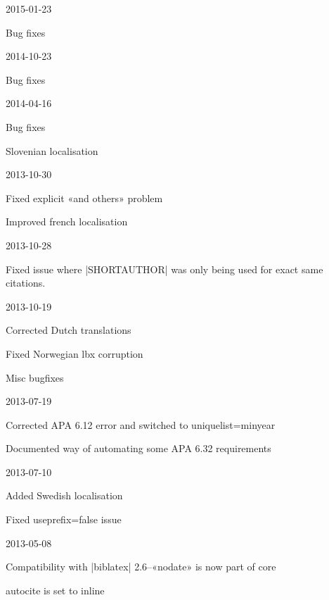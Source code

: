\documentclass{ltxdockit}
\begin{document}
\begin{changelog}

\begin{release}{6.7}{2015-01-23}
\item Bug fixes
\end{release}

\begin{release}{6.6}{2014-10-23}
\item Bug fixes
\end{release}

\begin{release}{6.5}{2014-04-16}
\item Bug fixes
\item Slovenian localisation
\end{release}

\begin{release}{6.4}{2013-10-30}
\item Fixed explicit «and others» problem
\item Improved french localisation
\end{release}

\begin{release}{6.3}{2013-10-28}
\item Fixed issue where |SHORTAUTHOR| was only being used for exact same citations.
\end{release}

\begin{release}{6.2}{2013-10-19}
\item Corrected Dutch translations
\item Fixed Norwegian lbx corruption
\item Misc bugfixes
\end{release}

\begin{release}{6.1}{2013-07-19}
\item Corrected APA 6.12 error and switched to uniquelist=minyear
\item Documented way of automating some APA 6.32 requirements
\end{release}

\begin{release}{6.0}{2013-07-10}
\item Added Swedish localisation
\item Fixed useprefix=false issue
\end{release}

\begin{release}{5.9}{2013-05-08}
\item Compatibility with |biblatex| 2.6--«nodate» is now part of core
\item autocite is set to inline
\end{release}


\end{changelog}
\end{document}
